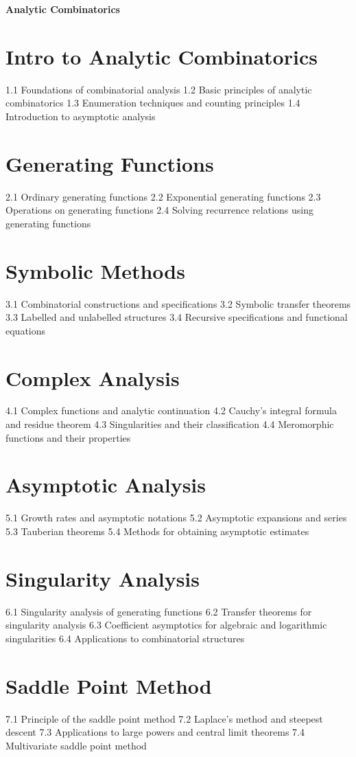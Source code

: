 {\LARGE \bf{Analytic Combinatorics}}
\section{Intro to Analytic Combinatorics}
1.1 Foundations of combinatorial analysis
1.2 Basic principles of analytic combinatorics
1.3 Enumeration techniques and counting principles
1.4 Introduction to asymptotic analysis
\section{Generating Functions}
2.1 Ordinary generating functions
2.2 Exponential generating functions
2.3 Operations on generating functions
2.4 Solving recurrence relations using generating functions
\section{Symbolic Methods}
3.1 Combinatorial constructions and specifications
3.2 Symbolic transfer theorems
3.3 Labelled and unlabelled structures
3.4 Recursive specifications and functional equations
\section{Complex Analysis}
4.1 Complex functions and analytic continuation
4.2 Cauchy's integral formula and residue theorem
4.3 Singularities and their classification
4.4 Meromorphic functions and their properties
\section{Asymptotic Analysis}
5.1 Growth rates and asymptotic notations
5.2 Asymptotic expansions and series
5.3 Tauberian theorems
5.4 Methods for obtaining asymptotic estimates
\section{Singularity Analysis}
6.1 Singularity analysis of generating functions
6.2 Transfer theorems for singularity analysis
6.3 Coefficient asymptotics for algebraic and logarithmic singularities
6.4 Applications to combinatorial structures
\section{Saddle Point Method}
7.1 Principle of the saddle point method
7.2 Laplace's method and steepest descent
7.3 Applications to large powers and central limit theorems
7.4 Multivariate saddle point method
